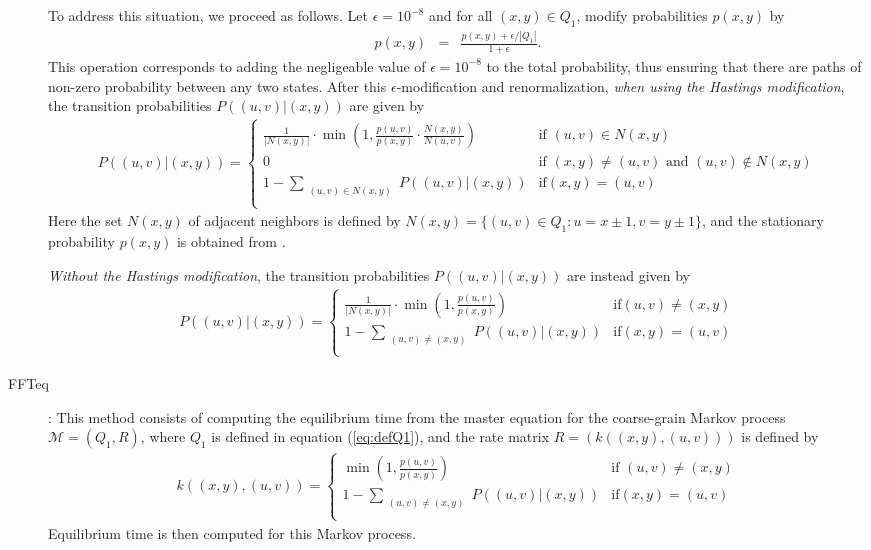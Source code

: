\begin{description}
To address this situation, we proceed as follows. Let $\epsilon =
10^{-8}$ and for all $(x,y) \in Q_1$, modify probabilities $p(x,y)$ by
\begin{eqnarray}
\label{eq:modifyNormalizeCellProb} p(x,y) &=& \frac{p(x,y) +
\epsilon/|Q_1|}{1+\epsilon }.
\end{eqnarray}
This operation corresponds to adding the negligeable value of
$\epsilon=10^{-8}$ to the total probability, thus ensuring that there
are paths of non-zero probability between any two states. After this
$\epsilon$-modification and renormalization, {\em when using the
Hastings modification}, the transition probabilities $P( (u,v) | (x,y)
)$ are given by
\begin{eqnarray}
\label{eq:transitionProbabilityFFTbor2DwithHastings} P( (u,v) |(x,y)
) = \left\{
\begin{array}{ll}
\frac{1}{|N(x,y)|} \cdot \min(1, \frac{p(u,v)}{p(x,y)} \cdot
\frac{N(x,y)}{N(u,v)}) &\mbox{if $(u,v) \in N(x,y)$}\\
0 &\mbox{if $(x,y) \ne (u,v) \mbox{ and } (u,v) \not\in N(x,y)$}\\
1 - \sum_{\substack{(u,v) \in N(x,y)}} P( (u,v) | (x,y) ) &\mbox{if
$(x,y) =(u,v)$}\\
\end{array}
\right.
\end{eqnarray}
Here the set $N(x,y)$ of adjacent neighbors is defined by $N(x,y) = \{
(u,v) \in Q_1 : u = x \pm 1, v = y \pm 1 \}$, and the stationary
probability $p(x,y)$ is obtained from \ffttwo.

{\em Without the Hastings modification}, the transition probabilities
$P( (u,v) | (x,y) )$ are instead given by
\begin{eqnarray}
\label{eq:transitionProbabilityFFTbor2DwithoutHastings} P( (u,v)
|(x,y) ) = \left\{
\begin{array}{ll}
\frac{1}{|N(x,y)|} \cdot \min(1, \frac{p(u,v)}{p(x,y)}) &\mbox{if
$(u,v) \ne (x,y)$}\\
1 - \sum_{\substack{(u,v) \ne (x,y)}} P( (u,v) | (x,y) ) &\mbox{if
$(x,y) =(u,v)$}\\
\end{array}
\right.
\end{eqnarray}

\item[FFTeq]: This method consists of computing the equilibrium time
from the master equation for the coarse-grain Markov process
$\mathcal{M}=(Q_1,R)$, where $Q_1$ is defined in equation
(\ref{eq:defQ1}), and the rate matrix $R = ( k( (x,y), (u,v) ) )$ is
defined by
\begin{eqnarray}
\label{eq:rateProbabilityFFTbor2DwithoutHastings} k( (x,y), (u,v) ) =
\left\{
\begin{array}{ll}
\min(1, \frac{p(u,v)}{p(x,y)}) &\mbox{if $(u,v) \ne (x,y)$}\\
1 - \sum_{\substack{(u,v) \ne (x,y)}} P( (u,v) | (x,y) ) &\mbox{if
$(x,y) =(u,v)$}\\
\end{array}
\right.
\end{eqnarray}
Equilibrium time is then computed for this Markov process.


\end{description}
